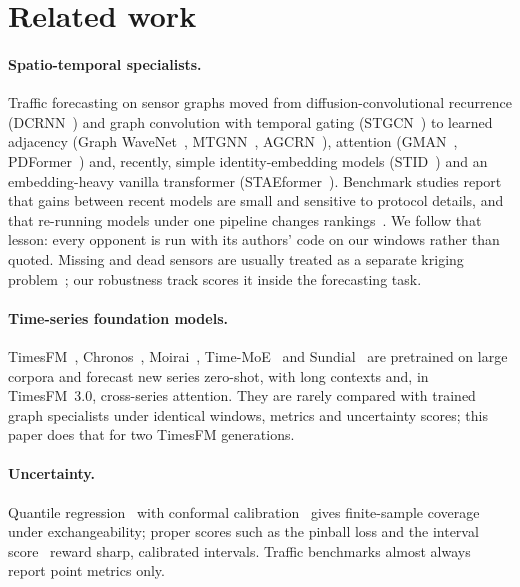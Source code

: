 \section{Related work}
\label{sec:related}

\paragraph{Spatio-temporal specialists.} Traffic forecasting on sensor graphs moved from diffusion-convolutional
recurrence (DCRNN~\citep{li2018dcrnn}) and graph convolution with temporal gating (STGCN~\citep{yu2018stgcn}) to
learned adjacency (Graph WaveNet~\citep{wu2019graphwavenet}, MTGNN~\citep{wu2020mtgnn}, AGCRN~\citep{bai2020agcrn}),
attention (GMAN~\citep{zheng2020gman}, PDFormer~\citep{jiang2023pdformer}) and, recently, simple identity-embedding
models (STID~\citep{shao2022stid}) and an embedding-heavy vanilla transformer (STAEformer~\citep{liu2023staeformer}).
Benchmark studies report that gains between recent models are small and sensitive to protocol details, and that
re-running models under one pipeline changes rankings~\citep{shao2024basicts,liu2023largest}. We follow that
lesson: every opponent is run with its authors' code on our windows rather than quoted. Missing and dead sensors
are usually treated as a separate kriging problem~\citep{wu2021ignnk}; our robustness track scores it inside the
forecasting task.

\paragraph{Time-series foundation models.} TimesFM~\citep{das2024timesfm,timesfmrepo}, Chronos~\citep{ansari2024chronos},
Moirai~\citep{woo2024moirai}, Time-MoE~\citep{shi2025timemoe} and Sundial~\citep{sundial} are pretrained on large
corpora and forecast new series zero-shot, with long contexts and, in TimesFM~3.0, cross-series attention. They
are rarely compared with trained graph specialists under identical windows, metrics and uncertainty scores; this
paper does that for two TimesFM generations.

\paragraph{Uncertainty.} Quantile regression~\citep{koenker1978quantiles} with conformal
calibration~\citep{romano2019cqr} gives finite-sample coverage under exchangeability; proper scores such as
the pinball loss and the interval score~\citep{gneiting2007scoring} reward sharp, calibrated intervals. Traffic
benchmarks almost always report point metrics only.
